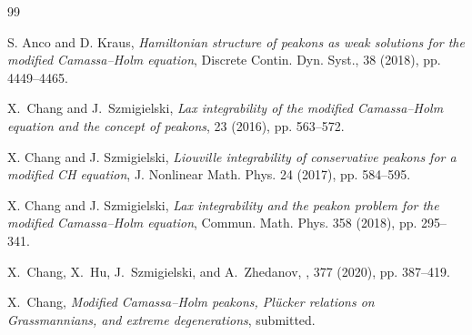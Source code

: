 \documentclass[11pt]{article}
\numberwithin{equation}{section}
\begin{document}
\begin{thebibliography}{99}

S. Anco and D. Kraus, 
{\em Hamiltonian structure of peakons as weak solutions for the modified Camassa–Holm
equation}, Discrete Contin. Dyn. Syst., 38 (2018), pp. 4449--4465.





X.~Chang and J.~Szmigielski,
{\em Lax {i}ntegrability of the {m}odified {C}amassa--{H}olm {e}quation and
  the {c}oncept of {p}eakons},
 23 (2016), pp. 563--572.

X. Chang and J. Szmigielski,
{\em Liouville integrability of conservative peakons for a modified CH equation},
{J. Nonlinear Math. Phys.} 24 (2017), pp. 584--595.

X. Chang and J. Szmigielski, {\em Lax integrability and the peakon problem for the modified Camassa–Holm
equation}, Commun. Math. Phys. 358 (2018), pp. 295--341.

X.~Chang, X.~Hu, J.~Szmigielski, and A.~Zhedanov,
,
 377 (2020), pp. 387--419.

X.~Chang,
{\em Modified Camassa--Holm peakons, Pl\"ucker relations on Grassmannians, and extreme degenerations}, submitted.


\end{thebibliography}
\end{document}
